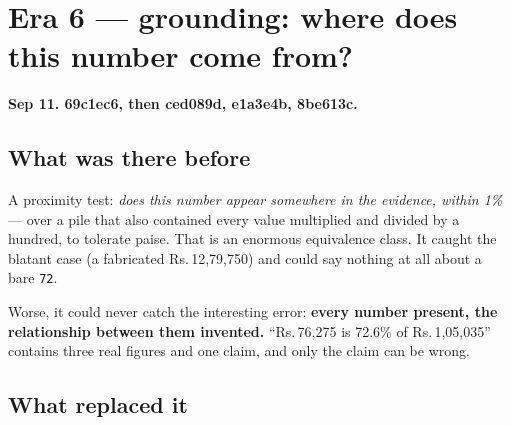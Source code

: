 \documentclass[11pt,a4paper]{report}
\newcommand{\rs}[1]{Rs.\,#1}
\newcommand{\code}[1]{\texttt{\small #1}}
\newcommand{\sha}[1]{{\ttfamily\small\color{slate}#1}}
\newenvironment{fitpic}
  {\par\medskip\begin{center}\begin{lrbox}{\fitbox}}
  {\end{lrbox}%
   \ifdim\wd\fitbox>\textwidth \resizebox{\textwidth}{!}{\usebox{\fitbox}}%
   \else \usebox{\fitbox}\fi
   \end{center}\medskip}
\begin{document}
\section{Era 6 --- grounding: where does this number come from?}
\label{sec:era6}

\textbf{Sep 11. \sha{69c1ec6}, then \sha{ced089d}, \sha{e1a3e4b}, \sha{8be613c}.}

\subsection{What was there before}

A proximity test: \emph{does this number appear somewhere in the evidence, within 1\%} --- over a
pile that also contained every value multiplied and divided by a hundred, to tolerate paise. That
is an enormous equivalence class. It caught the blatant case (a fabricated \rs{12{,}79{,}750}) and
could say nothing at all about a bare \code{72}.

Worse, it could never catch the interesting error: \textbf{every number present, the relationship
between them invented.} ``\rs{76{,}275} is 72.6\% of \rs{1{,}05{,}035}'' contains three real
figures and one claim, and only the claim can be wrong.

\subsection{What replaced it}

\begin{fitpic}
\end{fitpic}
\end{document}
